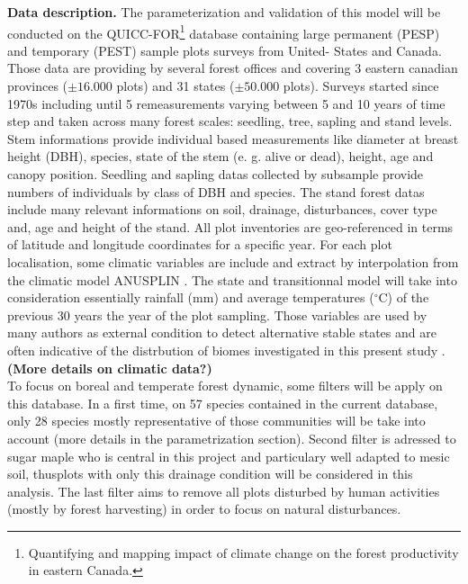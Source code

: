 \textbf{Data description.}  The parameterization and validation of this model
will be conducted on the QUICC-FOR\footnote{Quantifying and mapping impact of
climate change on the forest productivity in eastern Canada.} database
containing large permanent (PESP) and temporary (PEST) sample plots surveys
from United- States and Canada. Those data are providing by several forest
offices and covering 3 eastern canadian provinces ($\pm16.000$ plots) and 31
states ($\pm50.000$ plots). Surveys started since 1970s including until 5
remeasurements varying between 5 and 10 years of time step and taken across
many forest scales: seedling, tree, sapling and stand levels. Stem
informations provide individual based measurements like diameter at breast
height (DBH), species, state of the stem (e. g. alive or dead), height, age
and canopy position. Seedling and sapling datas collected by subsample provide
numbers of individuals  by class of DBH and species. The stand forest datas
include many relevant informations on soil, drainage, disturbances, cover type
and, age and height of the stand. All plot inventories are geo-referenced in
terms of latitude and longitude coordinates for a specific year. For each plot
localisation, some climatic variables are include and extract by interpolation
from the climatic model ANUSPLIN \cite{McKenney2011}. The state and
transitionnal model will take into consideration essentially rainfall (mm) and
average temperatures (\ensuremath{^\circ}C) of the previous 30 years the year of the
plot sampling. Those variables are used by many authors as external condition
to detect alternative stable states and are often indicative of the
distrbution of biomes investigated in this present study
\cite{Goldblum2010,Hirota2011,Scheffer2012}. \textbf{(More details on climatic
data?)}\\

To focus on boreal and temperate forest dynamic, some filters will be apply on
this database.  In a first time, on 57 species contained in the current
database, only 28 species mostly representative of those communities will be
take into account (more details in the parametrization section).
Second filter is adressed to sugar maple who is central in this project and
particulary well adapted to mesic soil, thusplots with  only this drainage
condition will be considered in this analysis. The last filter aims to remove
all plots disturbed by human activities (mostly by forest harvesting) in order
to focus on natural disturbances. \\

